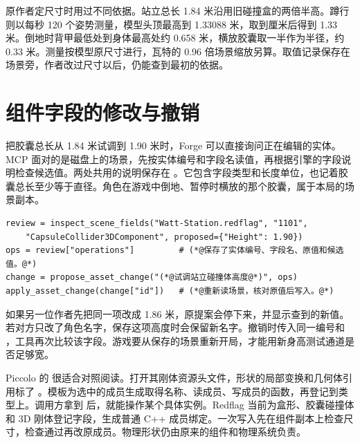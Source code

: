 原作者定尺寸时用过不同依据。站立总长 1.84 米沿用旧碰撞盒的两倍半高。蹲行则以每秒 120 个姿势测量，模型头顶最高到 1.33088 米，取到厘米后得到 1.33 米。倒地时背甲最低处到身体最高处约 0.658 米，横放胶囊取一半作为半径，约 0.33 米。测量按模型原尺寸进行，瓦特的 0.96 倍场景缩放另算。取值记录保存在场景旁，作者改过尺寸以后，仍能查到最初的依据。


\clearpage
\section{组件字段的修改与撤销}

把胶囊总长从 1.84 米试调到 1.90 米时，Forge 可以直接询问正在编辑的实体。MCP 面对的是磁盘上的场景，先按实体编号和字段名读值，再根据引擎的字段说明检查候选值。两处共用的说明保存在 。它包含字段类型和长度单位，也记着胶囊总长至少等于直径。角色在游戏中倒地、暂停时横放的那个胶囊，属于本局的场景副本。

\begin{lstlisting}
review = inspect_scene_fields("Watt-Station.redflag", "1101",
    "CapsuleCollider3DComponent", proposed={"Height": 1.90})
ops = review["operations"]         # (*@保存了实体编号、字段名、原值和候选值。@*)
change = propose_asset_change("(*@试调站立碰撞体高度@*)", ops)
apply_asset_change(change["id"])   # (*@重新读场景，核对原值后写入。@*)
\end{lstlisting}

如果另一位作者先把同一项改成 1.86 米，原提案会停下来，并显示查到的新值。若对方只改了角色名字，保存这项高度时会保留新名字。撤销时传入同一编号和 ，工具再次比较该字段。游戏要从保存的场景重新开局，才能用新身高测试通道是否足够宽。

Piccolo 的  很适合对照阅读。打开其刚体资源头文件，形状的局部变换和几何体引用标了 。模板为选中的成员生成取得名称、读成员、写成员的函数，再登记到类型上。调用方拿到  后，就能操作某个具体实例。Redflag 当前为盒形、胶囊碰撞体和 3D 刚体登记字段，生成普通 C++ 成员绑定。一次写入先在组件副本上检查尺寸，检查通过再改原成员。物理形状仍由原来的组件和物理系统负责。

